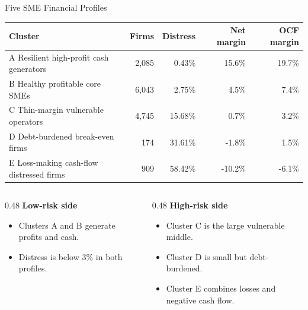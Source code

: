 \documentclass[aspectratio=169,10pt]{beamer}
\newcommand{\pct}[1]{#1\%}
\begin{document}
\begin{frame}{Five SME Financial Profiles}
  \small
  \begin{tabular}{p{}rrrr}
    \toprule
    Cluster & Firms & Distress & Net margin & OCF margin \\
    \midrule
    A Resilient high-profit cash generators
      & 2,085 & \pct{0.43} & \pct{15.6} & \pct{19.7} \\
    B Healthy profitable core SMEs
      & 6,043 & \pct{2.75} & \pct{4.5} & \pct{7.4} \\
    C Thin-margin vulnerable operators
      & 4,745 & \pct{15.68} & \pct{0.7} & \pct{3.2} \\
    D Debt-burdened break-even firms
      & 174 & \pct{31.61} & \pct{-1.8} & \pct{1.5} \\
    E Loss-making cash-flow distressed firms
      & 909 & \pct{58.42} & \pct{-10.2} & \pct{-6.1} \\
    \bottomrule
  \end{tabular}

  \vspace{0.35cm}
  \begin{columns}[T,totalwidth=\textwidth]
    \begin{column}{0.48\textwidth}
      \textbf{Low-risk side}
      \begin{itemize}
        \item Clusters A and B generate profits and cash.
        \item Distress is below \pct{3} in both profiles.
      \end{itemize}
    \end{column}
    \begin{column}{0.48\textwidth}
      \textbf{High-risk side}
      \begin{itemize}
        \item Cluster C is the large vulnerable middle.
        \item Cluster D is small but debt-burdened.
        \item Cluster E combines losses and negative cash flow.
      \end{itemize}
    \end{column}
  \end{columns}
\end{frame}
\end{document}
